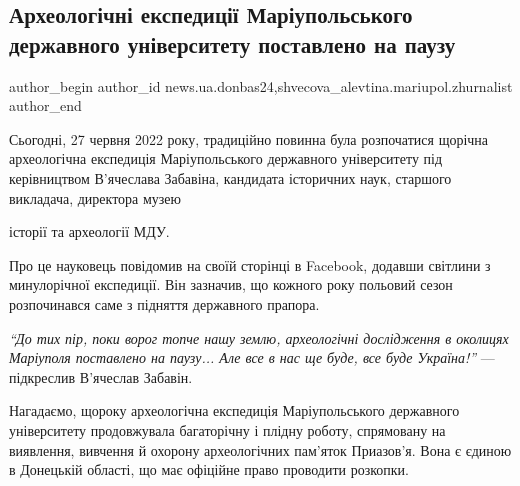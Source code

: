  
 
 
 
 
 
\subsection{Археологічні експедиції Маріупольського державного університету поставлено на паузу}
\label{sec:27_06_2022.stz.news.ua.donbas24.2.arheolog_ekspedicii_mdu_pauza}
 
\ifcmt
 author_begin
   author_id news.ua.donbas24,shvecova_alevtina.mariupol.zhurnalist
 author_end
\fi


Сьогодні, 27 червня 2022 року, традиційно повинна була розпочатися щорічна
археологічна експедиція Маріупольського державного університету під
керівництвом В'ячеслава Забавіна, кандидата історичних наук, старшого
викладача, директора музею\par\noindent історії та археології МДУ.

Про це науковець повідомив на своїй сторінці в Facebook, додавши світлини з
минулорічної експедиції. Він зазначив, що кожного року польовий сезон
розпочинався саме з підняття державного прапора.


\begin{leftbar}
\emph{\enquote{До тих пір, поки ворог топче нашу землю, археологічні дослідження в околицях
Маріуполя поставлено на паузу... Але все в нас ще буде, все буде Україна!}} —
підкреслив В'ячеслав Забавін.
\end{leftbar}

Нагадаємо, щороку археологічна експедиція Маріупольського державного
університету продовжувала багаторічну і плідну роботу, спрямовану на виявлення,
вивчення й охорону археологічних пам'яток Приазов'я. Вона є єдиною в Донецькій
області, що має офіційне право проводити розкопки.

